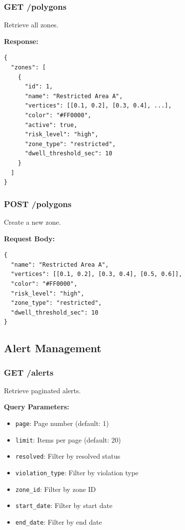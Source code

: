 \documentclass[12pt,a4paper,oneside]{book}
\begin{document}
\subsubsection{GET /polygons}

Retrieve all zones.

\textbf{Response:}
\begin{lstlisting}[style=jsonstyle]
{
  "zones": [
    {
      "id": 1,
      "name": "Restricted Area A",
      "vertices": [[0.1, 0.2], [0.3, 0.4], ...],
      "color": "#FF0000",
      "active": true,
      "risk_level": "high",
      "zone_type": "restricted",
      "dwell_threshold_sec": 10
    }
  ]
}
\end{lstlisting}

\subsubsection{POST /polygons}

Create a new zone.

\textbf{Request Body:}
\begin{lstlisting}[style=jsonstyle]
{
  "name": "Restricted Area A",
  "vertices": [[0.1, 0.2], [0.3, 0.4], [0.5, 0.6]],
  "color": "#FF0000",
  "risk_level": "high",
  "zone_type": "restricted",
  "dwell_threshold_sec": 10
}
\end{lstlisting}

\subsection{Alert Management}

\subsubsection{GET /alerts}

Retrieve paginated alerts.

\textbf{Query Parameters:}
\begin{itemize}
    \item \texttt{page}: Page number (default: 1)
    \item \texttt{limit}: Items per page (default: 20)
    \item \texttt{resolved}: Filter by resolved status
    \item \texttt{violation\_type}: Filter by violation type
    \item \texttt{zone\_id}: Filter by zone ID
    \item \texttt{start\_date}: Filter by start date
    \item \texttt{end\_date}: Filter by end date
\end{itemize}
\end{document}
